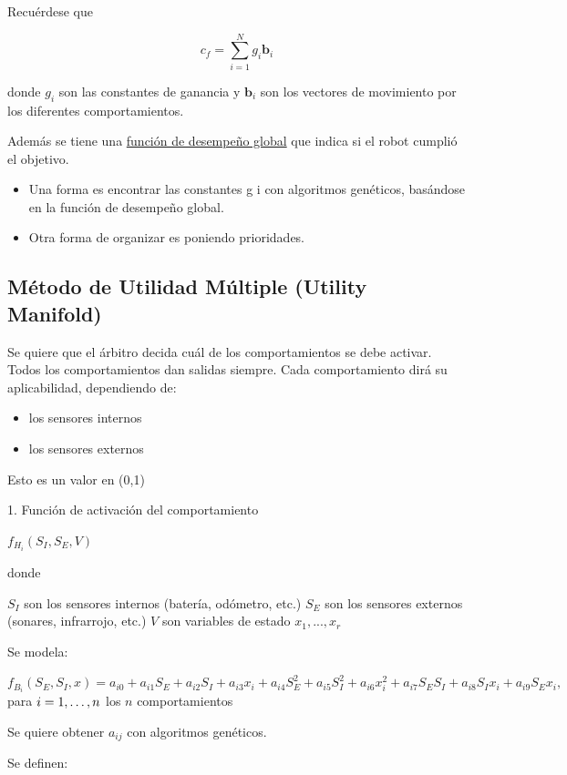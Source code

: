 Recuérdese que

$$c_f = \sum_{i=1}^{N} g_i \textbf{b}_i
 $$

donde $g_i$ son las constantes de ganancia y $\textbf{b}_i$ son los vectores de movimiento por los diferentes
comportamientos.

Además se tiene una \underline{función de desempeño global} que indica si el robot cumplió el objetivo.

\begin{itemize}
	\item[\textbullet]Una forma es encontrar las constantes g i con algoritmos genéticos, basándose en la función de
	desempeño global.
	\item[\textbullet]Otra forma de organizar es poniendo prioridades.
\end{itemize}

\subsection{Método de Utilidad Múltiple (Utility Manifold)}
Se quiere que el árbitro decida cuál de los comportamientos se debe activar.
Todos los comportamientos dan salidas siempre.
Cada comportamiento dirá su aplicabilidad, dependiendo de:

\begin{itemize}
		\item[\textbullet]los sensores internos
		\item[\textbullet]los sensores externos
\end{itemize}

Esto es un valor en (0,1)

1. Función de activación del comportamiento

$f_{H_i} (S_I, S_E , V)$

donde 

$S_I$ son los sensores internos (batería, odómetro, etc.)
$S_E$ son los sensores externos (sonares, infrarrojo, etc.) 
$V$ son variables de estado $x_1 ,..., x_r$

Se modela:

$f_{B_i}(S_E, S_I, x) = a_{i0} + a_{i1} S_E + a_{i2} S_I + a_{i3} x_i +  a_{i4} S_E^2 + a_{i5} S_I^2 + a_{i6} x_i^2 + a_{i7} S_E S_I + a_{i8} S_I x_i + a_{i9} S_E x_i ,$ para $i=1,\ldotp \ldotp \ldotp, n$ los $n$ comportamientos

Se quiere obtener $a_{ij}$ con algoritmos genéticos. 

Se definen: 


